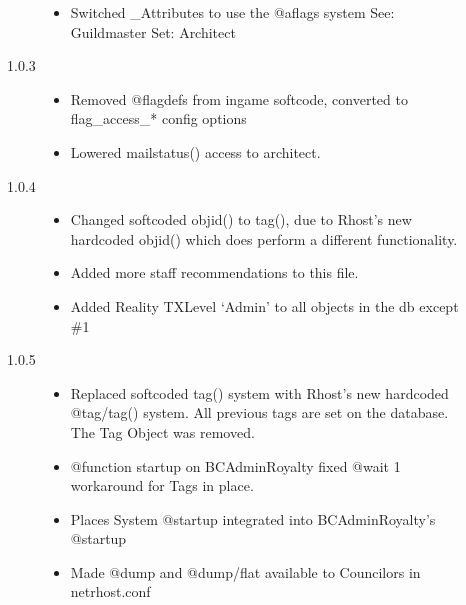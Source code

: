 \documentclass[letterpaper,10pt,english]{sphinxmanual}
\begin{document}
\begin{description}
\begin{description}
\begin{itemize}
\item {} 
\sphinxAtStartPar
Switched \_Attributes to use the @aflags system
See: Guildmaster
Set: Architect

\end{itemize}

\item[{1.0.3}] \leavevmode\begin{itemize}
\item {} 
\sphinxAtStartPar
Removed @flagdefs from in\sphinxhyphen{}game softcode, converted to flag\_access\_*
config options

\item {} 
\sphinxAtStartPar
Lowered mailstatus() access to architect.

\end{itemize}

\item[{1.0.4}] \leavevmode\begin{itemize}
\item {} 
\sphinxAtStartPar
Changed softcoded objid() to tag(), due to Rhost’s new hardcoded
objid() which does perform a different functionality.

\item {} 
\sphinxAtStartPar
Added more staff recommendations to this file.

\item {} 
\sphinxAtStartPar
Added Reality TXLevel ‘Admin’ to all objects in the db except \#1

\end{itemize}

\item[{1.0.5}] \leavevmode\begin{itemize}
\item {} 
\sphinxAtStartPar
Replaced softcoded tag() system with Rhost’s new hardcoded @tag/tag()
system. All previous tags are set on the database. The Tag Object
was removed.

\item {} 
\sphinxAtStartPar
@function startup on BC\sphinxhyphen{}Admin\sphinxhyphen{}Royalty fixed \sphinxhyphen{} @wait 1 workaround for
Tags in place.

\item {} 
\sphinxAtStartPar
Places System @startup integrated into BC\sphinxhyphen{}Admin\sphinxhyphen{}Royalty’s @startup

\item {} 
\sphinxAtStartPar
Made @dump and @dump/flat available to Councilors in netrhost.conf


\end{itemize}
\end{description}
\end{description}
\end{document}

